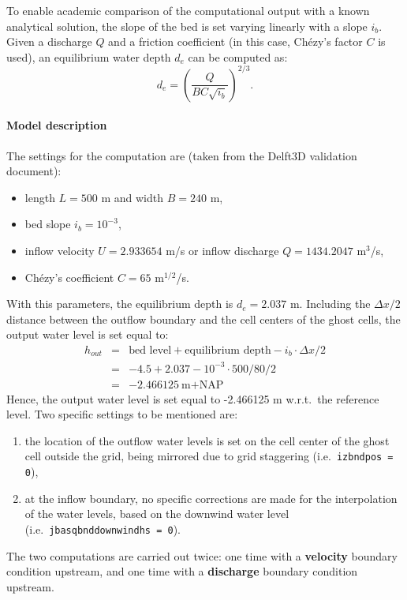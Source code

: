 To enable academic comparison of the computational output with a known analytical solution, the slope of the bed is set varying linearly with a slope $i_b$. Given a discharge $Q$ and a friction coefficient (in this case, Ch\'ezy's factor $C$ is used), an equilibrium water depth $d_e$ can be computed as:
\begin{equation}\label{eq:equilibriumdepth}
d_e = \left(\frac{Q}{B C \sqrt{i_b}}\right)^{2/3}.
\end{equation}



\paragraph*{Model description}
The settings for the computation are (taken from the Delft3D validation document):
\begin{itemize}
\item length $L = 500$ m and width $B = 240$ m,
\item bed slope $i_b = 10^{-3}$, 
\item inflow velocity $U = 2.933654$ m/s or inflow discharge $Q = 1434.2047$ m$^3$/s, 
\item Ch\'ezy's coefficient $C =  65$ m$^{1/2}$/s.
\end{itemize}
With this parameters, the equilibrium depth is $d_e = 2.037$ m. Including the $\Delta x / 2$ distance between the outflow boundary and the cell centers of the ghost cells, the output water level is set equal to:
\begin{eqnarray*}
h_{out} &=& \textrm{bed level} + \textrm{equilibrium depth} - i_b \cdot \Delta x / 2  \\
        &=& -4.5 + 2.037 - 10^{-3} \cdot 500 / 80 / 2  \\
        &=& -2.466125~\textrm{m+NAP}
\end{eqnarray*}
Hence, the output water level is set equal to -2.466125 m w.r.t.\ the reference level.  Two specific settings to be mentioned are:
\begin{enumerate}
\item the location of the outflow water levels is set on the cell center of the ghost cell outside the grid, being mirrored due to grid staggering (i.e.\ \texttt{izbndpos = 0}),
\item at the inflow boundary, no specific corrections are made for the interpolation of the water levels, based on the downwind water level (i.e.\ \texttt{jbasqbnddownwindhs = 0}).
\end{enumerate}
The two computations are carried out twice: one time with a \textbf{velocity} boundary condition upstream, and one time with a \textbf{discharge} boundary condition upstream.


